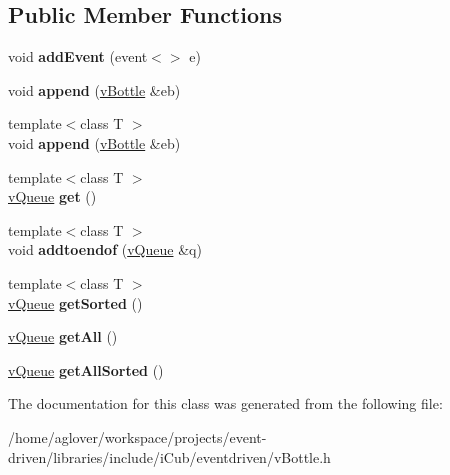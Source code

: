 \subsection*{Public Member Functions}
\begin{DoxyCompactItemize}
\item 
void {\bfseries add\+Event} (event$<$$>$ e)\hypertarget{classev_1_1vBottle_a5b17f0b46d9260ab255f38382b4b7268}{}\label{classev_1_1vBottle_a5b17f0b46d9260ab255f38382b4b7268}

\item 
void {\bfseries append} (\hyperlink{classev_1_1vBottle}{v\+Bottle} \&eb)\hypertarget{classev_1_1vBottle_a0c78e6f9ef839038d71486f6a8a6294a}{}\label{classev_1_1vBottle_a0c78e6f9ef839038d71486f6a8a6294a}

\item 
{\footnotesize template$<$class T $>$ }\\void {\bfseries append} (\hyperlink{classev_1_1vBottle}{v\+Bottle} \&eb)\hypertarget{classev_1_1vBottle_a9ef66f613e1bbf196c515e7d8b0416df}{}\label{classev_1_1vBottle_a9ef66f613e1bbf196c515e7d8b0416df}

\item 
{\footnotesize template$<$class T $>$ }\\\hyperlink{classev_1_1vQueue}{v\+Queue} {\bfseries get} ()\hypertarget{classev_1_1vBottle_a86302277c279a1b02d92f8e12afe6a2c}{}\label{classev_1_1vBottle_a86302277c279a1b02d92f8e12afe6a2c}

\item 
{\footnotesize template$<$class T $>$ }\\void {\bfseries addtoendof} (\hyperlink{classev_1_1vQueue}{v\+Queue} \&q)\hypertarget{classev_1_1vBottle_a65bf90aec03b80dee45bf834efe3fbfc}{}\label{classev_1_1vBottle_a65bf90aec03b80dee45bf834efe3fbfc}

\item 
{\footnotesize template$<$class T $>$ }\\\hyperlink{classev_1_1vQueue}{v\+Queue} {\bfseries get\+Sorted} ()\hypertarget{classev_1_1vBottle_a27569b9aaa7eb1ff9135d435b841c2de}{}\label{classev_1_1vBottle_a27569b9aaa7eb1ff9135d435b841c2de}

\item 
\hyperlink{classev_1_1vQueue}{v\+Queue} {\bfseries get\+All} ()\hypertarget{classev_1_1vBottle_af2abadf41f73c455dd451e34e9ba3376}{}\label{classev_1_1vBottle_af2abadf41f73c455dd451e34e9ba3376}

\item 
\hyperlink{classev_1_1vQueue}{v\+Queue} {\bfseries get\+All\+Sorted} ()\hypertarget{classev_1_1vBottle_a273cfda65fed58bcf19cedf6652948d9}{}\label{classev_1_1vBottle_a273cfda65fed58bcf19cedf6652948d9}

\end{DoxyCompactItemize}


The documentation for this class was generated from the following file\+:\begin{DoxyCompactItemize}
\item 
/home/aglover/workspace/projects/event-\/driven/libraries/include/i\+Cub/eventdriven/v\+Bottle.\+h\end{DoxyCompactItemize}
